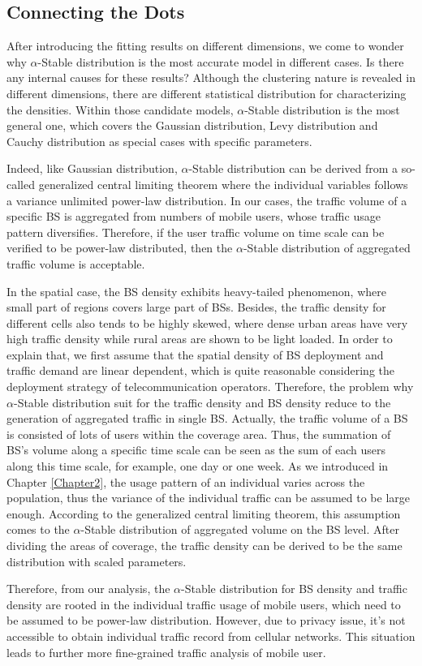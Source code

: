 \subsection{Connecting the Dots}
After introducing the fitting results on different dimensions, we come to wonder why $\alpha$-Stable distribution is the most accurate model in different cases. Is there any internal causes for these results? Although the clustering nature is revealed in different dimensions, there are different statistical distribution for characterizing the densities. Within those candidate models, $\alpha$-Stable distribution is the most general one, which covers the Gaussian distribution, Levy distribution and Cauchy distribution as special cases with specific parameters.

Indeed, like Gaussian distribution, $\alpha$-Stable distribution can be derived from a so-called generalized central limiting theorem where the individual variables follows a variance unlimited power-law distribution. In our cases, the traffic volume of a specific BS is aggregated from numbers of mobile users, whose traffic usage pattern diversifies. Therefore, if the user traffic volume on time scale can be verified to be power-law distributed, then the $\alpha$-Stable distribution of aggregated traffic volume is acceptable.

In the spatial case, the BS density exhibits heavy-tailed phenomenon, where small part of regions covers large part of BSs. Besides, the traffic density for different cells also tends to be highly skewed, where dense urban areas have very high traffic density while rural areas are shown to be light loaded. In order to explain that, we first assume that the spatial density of BS deployment and traffic demand are linear dependent, which is quite reasonable considering the deployment strategy of telecommunication operators. Therefore, the problem why $\alpha$-Stable distribution suit for the traffic density and BS density reduce to the generation of aggregated traffic in single BS. Actually, the traffic volume of a BS is consisted of lots of users within the coverage area. Thus, the summation of BS's volume along a specific time scale can be seen as the sum of each users along this time scale, for example, one day or one week. As we introduced in Chapter \ref{Chapter2}, the usage pattern of an individual varies across the population, thus the variance of the individual traffic can be assumed to be large enough. According to the generalized central limiting theorem, this assumption comes to the $\alpha$-Stable distribution of aggregated volume on the BS level. After dividing the areas of coverage, the traffic density can be derived to be the same distribution with scaled parameters.

Therefore, from our analysis, the $\alpha$-Stable distribution for BS density and traffic density are rooted in the individual traffic usage of mobile users, which need to be assumed to be power-law distribution. However, due to privacy issue, it's not accessible to obtain individual traffic record from cellular networks. This situation leads to further more fine-grained traffic analysis of mobile user.
